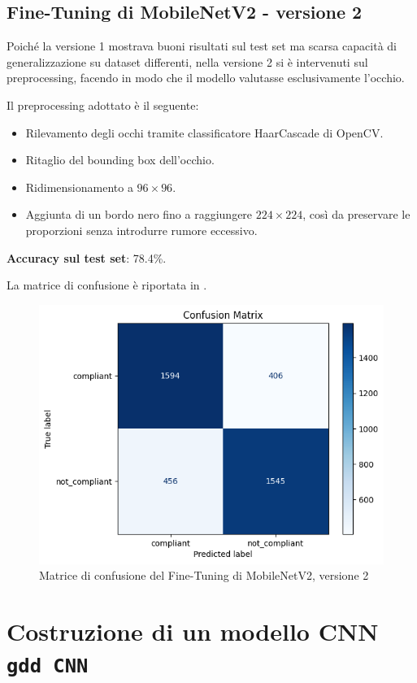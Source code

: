 \documentclass[12pt,a4paper,openright,twoside]{book}
\begin{document}
\subsection{Fine-Tuning di MobileNetV2 - versione 2}
\label{chap:mobilenetv2_ft_v2}

Poiché la versione 1 mostrava buoni risultati sul test set ma scarsa capacità di generalizzazione su dataset differenti, nella versione 2 si è intervenuti sul preprocessing, facendo in modo che il modello valutasse esclusivamente l'occhio.  

Il preprocessing adottato è il seguente:
\begin{itemize}
    \item Rilevamento degli occhi tramite classificatore HaarCascade di OpenCV.
    \item Ritaglio del bounding box dell'occhio.
    \item Ridimensionamento a \(96 \times 96\).
    \item Aggiunta di un bordo nero fino a raggiungere \(224 \times 224\), così da preservare le proporzioni senza introdurre rumore eccessivo.
\end{itemize}

\textbf{Accuracy sul test set}: 78.4\%.  

La matrice di confusione è riportata in .  

\begin{figure}
    \centering
    \includegraphics[width=.6\linewidth]{figures/fine-tuning-mobilenetv2-version-2-confusion-matrix.png}
    \caption{Matrice di confusione del Fine-Tuning di MobileNetV2, versione 2}
    \label{fig:fine_tuning_mobilenetv2_version_2_confusion_matrix}
\end{figure}

\section{Costruzione di un modello CNN \texttt{gdd CNN}}
\label{chap:build_cnn_model}
\end{document}
